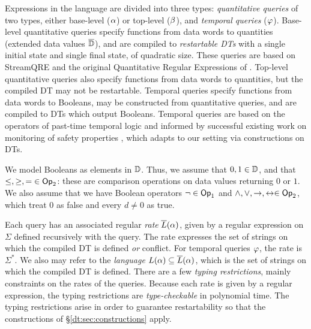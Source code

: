Expressions in the language are divided into three types: \emph{quantitative queries} of two types, either base-level ($\alpha$) or top-level ($\beta$), and \emph{temporal queries} ($\varphi$). Base-level quantitative queries specify functions from data words to quantities (extended data values $\overline{\mathbb{D}{}}$), and are compiled to \emph{restartable DTs} with a single initial state and single final state, of quadratic size. These queries are based on StreamQRE and the original Quantitative Regular Expressions of \cite{QRE}. Top-level quantitative queries also specify functions from data words to quantities, but the compiled DT may not be restartable. Temporal queries specify functions from data words to Booleans, may be constructed from quantitative queries, and are compiled to DTs which output Booleans. Temporal queries are based on the operators of past-time temporal logic \cite{manna2012temporal} and informed by successful existing work on monitoring of safety properties \cite{havelund2004efficient}, which adapts to our setting via constructions on DTs.

We model Booleans as elements in $\mathbb{D}$. Thus, we assume that $0, 1 \in \mathbb{D}$, and that $\le, \ge, = \;\in \textsf{Op}_2$: these are comparison operations on data values returning $0$ or $1$. We also assume that we have Boolean operators $\lnot \in \textsf{Op}_1$ and $\land, \lor, \to, \leftrightarrow \in \textsf{Op}_2$,
which treat $0$ as false and every $d \ne 0$ as true.

Each query has an associated regular \emph{rate} $\overline{L}(\alpha)$, given by a regular expression on $\Sigma$ defined recursively with the query. The rate expresses the set of strings on which the compiled DT is defined \emph{ or } conflict. For temporal queries $\varphi$, the rate is $\Sigma^{*}$. We also may refer to the \emph{language} $L(\alpha) \subseteq \overline{L}(\alpha)$, which is the set of strings on which the compiled DT is defined.
There are a few \emph{typing restrictions}, mainly constraints on the rates of the queries. Because each rate is given by a regular expression, the typing restrictions are \emph{type-checkable} in polynomial time.
The typing restrictions arise in order to guarantee restartability so that the constructions of \S\ref{dt:sec:constructions} apply.

